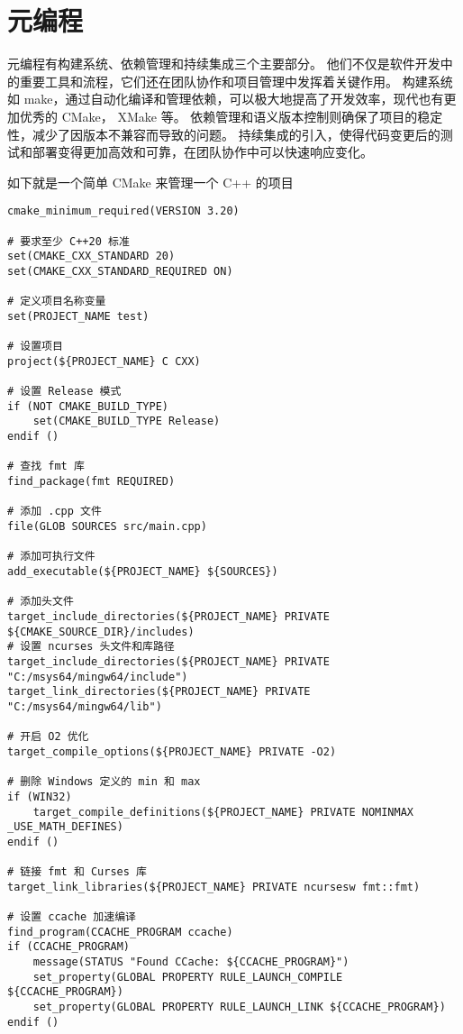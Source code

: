 \documentclass[16pt]{lzc}
\begin{document}
    \section{元编程}\label{sec:2}
        元编程有构建系统、依赖管理和持续集成三个主要部分。
        他们不仅是软件开发中的重要工具和流程，它们还在团队协作和项目管理中发挥着关键作用。
        构建系统如 make，通过自动化编译和管理依赖，可以极大地提高了开发效率，现代也有更加优秀的 CMake， XMake 等。
        依赖管理和语义版本控制则确保了项目的稳定性，减少了因版本不兼容而导致的问题。
        持续集成的引入，使得代码变更后的测试和部署变得更加高效和可靠，在团队协作中可以快速响应变化。

        如下就是一个简单 CMake 来管理一个 C++ 的项目
        \begin{verbatim}
cmake_minimum_required(VERSION 3.20)

# 要求至少 C++20 标准
set(CMAKE_CXX_STANDARD 20)
set(CMAKE_CXX_STANDARD_REQUIRED ON)

# 定义项目名称变量
set(PROJECT_NAME test)

# 设置项目
project(${PROJECT_NAME} C CXX)

# 设置 Release 模式
if (NOT CMAKE_BUILD_TYPE)
    set(CMAKE_BUILD_TYPE Release)
endif ()

# 查找 fmt 库
find_package(fmt REQUIRED)

# 添加 .cpp 文件
file(GLOB SOURCES src/main.cpp)

# 添加可执行文件
add_executable(${PROJECT_NAME} ${SOURCES})

# 添加头文件
target_include_directories(${PROJECT_NAME} PRIVATE ${CMAKE_SOURCE_DIR}/includes)
# 设置 ncurses 头文件和库路径
target_include_directories(${PROJECT_NAME} PRIVATE "C:/msys64/mingw64/include")
target_link_directories(${PROJECT_NAME} PRIVATE "C:/msys64/mingw64/lib")

# 开启 O2 优化
target_compile_options(${PROJECT_NAME} PRIVATE -O2)

# 删除 Windows 定义的 min 和 max
if (WIN32)
    target_compile_definitions(${PROJECT_NAME} PRIVATE NOMINMAX _USE_MATH_DEFINES)
endif ()

# 链接 fmt 和 Curses 库
target_link_libraries(${PROJECT_NAME} PRIVATE ncursesw fmt::fmt)

# 设置 ccache 加速编译
find_program(CCACHE_PROGRAM ccache)
if (CCACHE_PROGRAM)
    message(STATUS "Found CCache: ${CCACHE_PROGRAM}")
    set_property(GLOBAL PROPERTY RULE_LAUNCH_COMPILE ${CCACHE_PROGRAM})
    set_property(GLOBAL PROPERTY RULE_LAUNCH_LINK ${CCACHE_PROGRAM})
endif ()
        \end{verbatim}
\end{document}
